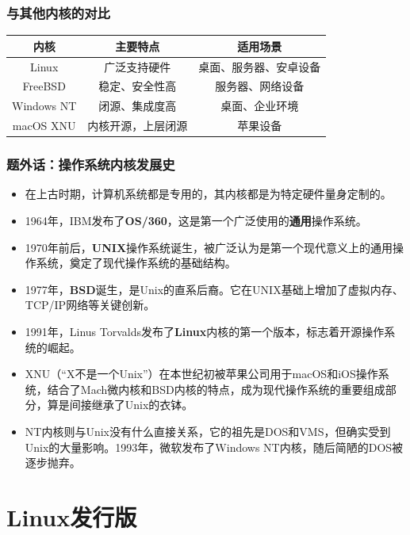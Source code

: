 \documentclass[aspectratio=1610]{ctexbeamer}
\begin{document}
\begin{frame}[fragile]
  \frametitle{与其他内核的对比}
  \begin{table}
    \centering
    \begin{tabular}{ccc}
      \toprule
      内核 & 主要特点 & 适用场景 \\
      \midrule
      Linux  & 广泛支持硬件 & 桌面、服务器、安卓设备 \\
      FreeBSD & 稳定、安全性高 & 服务器、网络设备 \\
      Windows NT & {\color{red}闭源}、集成度高 & 桌面、企业环境 \\
      macOS XNU & 内核开源，上层闭源 & 苹果设备 \\
      \bottomrule
    \end{tabular}
  \end{table}
\end{frame}

\begin{frame}
  \frametitle{题外话：操作系统内核发展史}

  \begin{itemize}
    \item 在上古时期，计算机系统都是专用的，其内核都是为特定硬件量身定制的。
    \item 1964年，IBM发布了\textbf{OS/360}，这是第一个广泛使用的\textbf{通用}操作系统。
    \item 1970年前后，\textbf{UNIX}操作系统诞生，被广泛认为是第一个现代意义上的通用操作系统，奠定了现代操作系统的基础结构。
    \item 1977年，\textbf{BSD}诞生，是Unix的直系后裔。它在UNIX基础上增加了虚拟内存、TCP/IP网络等关键创新。
    \item 1991年，Linus Torvalds发布了\textbf{Linux}内核的第一个版本，标志着开源操作系统的崛起。
    \item XNU（“X不是一个Unix”）在本世纪初被苹果公司用于macOS和iOS操作系统，结合了Mach微内核和BSD内核的特点，成为现代操作系统的重要组成部分，算是间接继承了Unix的衣钵。
    \item NT内核则与Unix没有什么直接关系，它的祖先是DOS和VMS，但确实受到Unix的大量影响。1993年，微软发布了Windows NT内核，随后简陋的DOS被逐步抛弃。
  \end{itemize}

\end{frame}

\section{Linux发行版}
\end{document}
